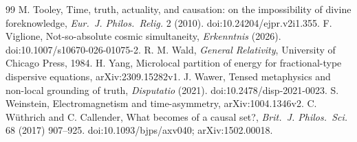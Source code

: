 \documentclass[11pt]{article}
\theoremstyle{definition}
\begin{document}
\begin{thebibliography}{99}
 M. Tooley, Time, truth, actuality, and causation: on the impossibility of divine foreknowledge, \emph{Eur.\ J. Philos.\ Relig.} 2 (2010). doi:10.24204/ejpr.v2i1.355.
 F. Viglione, Not-so-absolute cosmic simultaneity, \emph{Erkenntnis} (2026). doi:10.1007/s10670-026-01075-2.
 R. M. Wald, \emph{General Relativity}, University of Chicago Press, 1984.
 H. Yang, Microlocal partition of energy for fractional-type dispersive equations, arXiv:2309.15282v1.
 J. Wawer, Tensed metaphysics and non-local grounding of truth, \emph{Disputatio} (2021). doi:10.2478/disp-2021-0023.
 S. Weinstein, Electromagnetism and time-asymmetry, arXiv:1004.1346v2.
 C. Wüthrich and C. Callender, What becomes of a causal set?, \emph{Brit.\ J. Philos.\ Sci.} 68 (2017) 907--925. doi:10.1093/bjps/axv040; arXiv:1502.00018.
\end{thebibliography}
\end{document}
